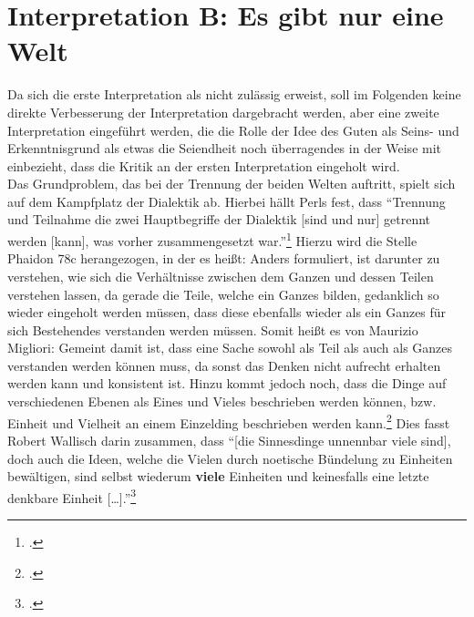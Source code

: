 \section{Interpretation B: Es gibt nur eine Welt}
Da sich die erste Interpretation als nicht zulässig erweist, soll im Folgenden keine direkte Verbesserung der Interpretation dargebracht werden, aber eine zweite Interpretation eingeführt werden, die die Rolle der Idee des Guten als Seins- und Erkenntnisgrund als etwas die Seiendheit noch überragendes in der Weise mit einbezieht, dass die Kritik an der ersten Interpretation eingeholt wird.\\
Das Grundproblem, das bei der Trennung der beiden Welten auftritt, spielt sich auf dem Kampfplatz der Dialektik ab. Hierbei hällt Perls fest, dass \enquote{Trennung und Teilnahme die zwei Hauptbegriffe der Dialektik [sind und nur] getrennt werden [kann], was vorher zusammengesetzt war.}\footcite[vgl.][S. 349]{Perls}
Hierzu wird die Stelle Phaidon 78c herangezogen, in der es heißt:
Anders formuliert, ist darunter zu verstehen, wie sich die Verhältnisse zwischen dem Ganzen und dessen Teilen verstehen lassen, da gerade die Teile, welche ein Ganzes bilden, gedanklich so wieder eingeholt werden müssen, dass diese ebenfalls wieder als ein Ganzes für sich Bestehendes verstanden werden müssen. Somit heißt es von Maurizio Migliori:
Gemeint damit ist, dass eine Sache sowohl als Teil als auch als Ganzes verstanden werden können muss, da sonst das Denken nicht aufrecht erhalten werden kann und konsistent ist.
Hinzu kommt jedoch noch, dass die Dinge auf verschiedenen Ebenen als Eines und Vieles beschrieben werden können, bzw. Einheit und Vielheit an einem Einzelding beschrieben werden kann.\footcite[vgl.][S. 112]{Migliori} Dies fasst Robert Wallisch darin zusammen, dass \enquote{[die Sinnesdinge unnennbar viele sind], doch auch die Ideen, welche die Vielen durch noetische Bündelung zu Einheiten bewältigen, sind selbst wiederum \textbf{viele} Einheiten und keinesfalls eine letzte denkbare Einheit [\dots].}\footcite[vgl.][S. 12]{Wallisch}

